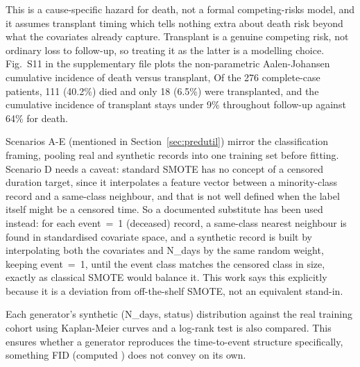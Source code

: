  This is a cause-specific hazard for death, not a formal competing-risks model, and it assumes transplant timing which tells nothing extra about death risk beyond what the covariates already capture. Transplant is a genuine competing risk, not ordinary loss to follow-up, so treating it as the latter is a modelling choice. Fig.~S11 in the supplementary file plots the non-parametric Aalen-Johansen cumulative incidence of death versus transplant,  Of the 276 complete-case patients, 111 (40.2\%) died and only 18 (6.5\%) were transplanted, and the cumulative incidence of transplant stays under 9\% throughout follow-up against 64\% for death.  

Scenarios A-E (mentioned in Section~\ref{sec:predutil}) mirror the classification framing, pooling real and synthetic records into one training set before fitting. Scenario D needs a caveat: standard SMOTE has no concept of a censored duration target, since it interpolates a feature vector between a minority-class record and a same-class neighbour, and that is not well defined when the label itself might be a censored time. So a documented substitute has been used instead: for each event~=~1 (deceased) record, a same-class nearest neighbour is found in standardised covariate space, and a synthetic record is built by interpolating both the covariates and N\_days by the same random weight, keeping event~=~1, until the event class matches the censored class in size, exactly as classical SMOTE would balance it. This work says this explicitly because it is a deviation from off-the-shelf SMOTE, not an equivalent stand-in.

Each generator's synthetic (N\_days, status) distribution against the real training cohort using Kaplan-Meier curves and a log-rank test is also compared. This ensures whether a generator reproduces the time-to-event structure specifically, something FID (computed ) does not convey on its own.

